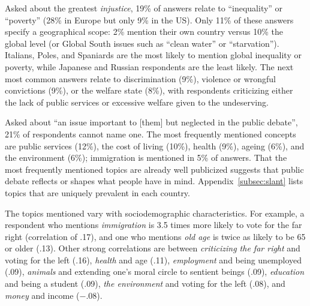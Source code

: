 \documentclass[12pt,english]{article}
\begin{document}
Asked about the greatest \textit{injustice}, 19\% of answers relate to ``inequality'' or ``poverty'' (28\% in Europe but only 9\% in the US). Only 11\% of these answers specify a geographical scope: 2\% mention their own country versus 10\% the global level (or Global South issues such as ``clean water'' or ``starvation''). Italians, Poles, and Spaniards are the most likely to mention global inequality or poverty, while Japanese and Russian respondents are the least likely. The next most common answers relate to discrimination (9\%), violence or wrongful convictions (9\%), or the welfare state (8\%), with respondents criticizing either the lack of public services or excessive welfare given to the undeserving.

Asked about ``an issue important to [them] but neglected in the public debate'', 21\% of respondents cannot name one. The most frequently mentioned concepts are public services (12\%), the cost of living (10\%), health (9\%), ageing (6\%), and the environment (6\%); immigration is mentioned in 5\% of answers. That the most frequently mentioned topics are already well publicized suggests that public debate reflects or shapes what people have in mind. Appendix~\ref{subsec:slant} lists topics that are uniquely prevalent in each country.

The topics mentioned vary with sociodemographic characteristics. For example, a respondent who mentions \textit{immigration} is 3.5 times more likely to vote for the far right (correlation of .17), and one who mentions \textit{old age} is twice as likely to be 65 or older (.13). Other strong correlations are between \textit{criticizing the far right} and voting for the left (.16), \textit{health} and age (.11), \textit{employment} and being unemployed (.09), \textit{animals} and extending one's moral circle to sentient beings (.09), \textit{education} and being a student (.09), \textit{the environment} and voting for the left (.08), and \textit{money} and income ($-$.08).
\end{document}
